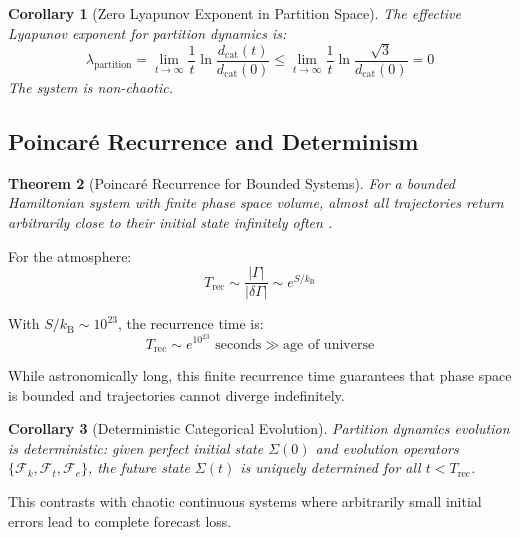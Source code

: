 \documentclass[twocolumn,10pt,a4paper]{article}
\newtheorem{theorem}{Theorem}[section]
\newtheorem{corollary}[theorem]{Corollary}
\theoremstyle{definition}
\theoremstyle{remark}
\newcommand{\kB}{k_{\mathrm{B}}}
\begin{document}
\begin{corollary}[Zero Lyapunov Exponent in Partition Space]
\label{cor:zero_lyapunov}
The effective Lyapunov exponent for partition dynamics is:
\begin{equation}
    \lambda_{\text{partition}} = \lim_{t\to\infty} \frac{1}{t} \ln\frac{d_{\text{cat}}(t)}{d_{\text{cat}}(0)} \leq \lim_{t\to\infty} \frac{1}{t} \ln\frac{\sqrt{3}}{d_{\text{cat}}(0)} = 0
\end{equation}
The system is non-chaotic.
\end{corollary}

\subsection{Poincaré Recurrence and Determinism}

\begin{theorem}[Poincaré Recurrence for Bounded Systems]
\label{thm:poincare_recurrence}
For a bounded Hamiltonian system with finite phase space volume, almost all trajectories return arbitrarily close to their initial state infinitely often \cite{poincare1890,kac1959probability}.
\end{theorem}

For the atmosphere:
\begin{equation}
    T_{\text{rec}} \sim \frac{|\Gamma|}{|\delta\Gamma|} \sim e^{S/\kB}
\end{equation}

With $S/\kB \sim 10^{23}$, the recurrence time is:
\begin{equation}
    T_{\text{rec}} \sim e^{10^{23}} \text{ seconds} \gg \text{age of universe}
\end{equation}

While astronomically long, this finite recurrence time guarantees that phase space is bounded and trajectories cannot diverge indefinitely.

\begin{corollary}[Deterministic Categorical Evolution]
\label{cor:deterministic}
Partition dynamics evolution is deterministic: given perfect initial state $\Sigma(0)$ and evolution operators $\{\mathcal{F}_k, \mathcal{F}_t, \mathcal{F}_e\}$, the future state $\Sigma(t)$ is uniquely determined for all $t < T_{\text{rec}}$.
\end{corollary}

This contrasts with chaotic continuous systems where arbitrarily small initial errors lead to complete forecast loss.
\end{document}
